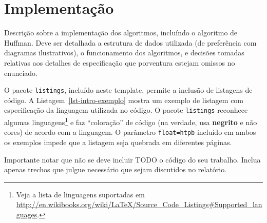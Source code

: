 \chapter{Implementação}
\label{sec-implementacao}


Descrição sobre a implementação dos algoritmos, incluíndo o algoritmo de Huffman. Deve ser detalhada a estrutura de dados utilizada (de preferência com diagramas ilustrativos), o funcionamento dos algoritmos, e decisões tomadas relativas aos detalhes de especificação que porventura estejam omissos no enunciado.


O pacote \texttt{listings}, incluído neste template, permite a inclusão de listagens de código.  A Listagem~\ref{lst-intro-exemplo} mostra um exemplo de listagem com especificação da linguagem utilizada no código. O pacote \texttt{listings} reconhece algumas linguagens\footnote{Veja a lista de linguagens suportadas em \url{http://en.wikibooks.org/wiki/LaTeX/Source\_Code\_Listings\#Supported_languages}.} e faz ``coloração'' de código (na verdade, usa \textbf{negrito} e não cores) de acordo com a linguagem. O parâmetro \texttt{float=htpb} incluído em ambos os exemplos impede que a listagem seja quebrada em diferentes páginas.

Importante notar que não se deve incluir TODO o código do seu trabalho. Inclua apenas trechos que julgue necessário que sejam discutidos no relatório.



